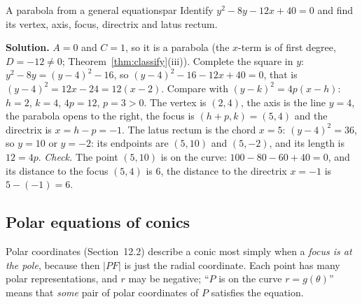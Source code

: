 \documentclass[11pt]{article}
\begin{document}
\begin{exmp}{A parabola from a general equation}{spar}
Identify $y^2-8y-12x+40=0$ and find its vertex, axis, focus, directrix and latus rectum.

\textbf{Solution.} $A=0$ and $C=1$, so it is a parabola (the $x$-term is of first degree, $D=-12\ne0$; Theorem~\ref{thm:classify}(iii)). Complete the square in $y$: $y^2-8y=(y-4)^2-16$, so $(y-4)^2-16-12x+40=0$, that is $(y-4)^2=12x-24=12(x-2)$. Compare with $(y-k)^2=4p(x-h)$: $h=2$, $k=4$, $4p=12$, $p=3>0$. The vertex is $(2,4)$, the axis is the line $y=4$, the parabola opens to the right, the focus is $(h+p,k)=(5,4)$ and the directrix is $x=h-p=-1$. The latus rectum is the chord $x=5$: $(y-4)^2=36$, so $y=10$ or $y=-2$: its endpoints are $(5,10)$ and $(5,-2)$, and its length is $12=4p$.
\emph{Check.} The point $(5,10)$ is on the curve: $100-80-60+40=0$, and its distance to the focus $(5,4)$ is $6$, the distance to the directrix $x=-1$ is $5-(-1)=6$.
\end{exmp}

\subsection*{Polar equations of conics}

Polar coordinates (Section~12.2) describe a conic most simply when a \emph{focus is at the pole}, because then $\lvert PF\rvert$ is just the radial coordinate. Each point has many polar representations, and $r$ may be negative; ``$P$ is on the curve $r=g(\theta)$'' means that \emph{some} pair of polar coordinates of $P$ satisfies the equation.
\end{document}
